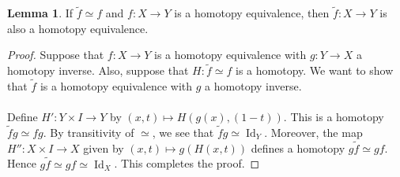 \documentclass[10pt,letterpaper,cm]{nupset}
\theoremstyle{definition}
\newtheorem{lemma}{Lemma}
\newcommand{\1}{\mathbf{1}}
\newcommand{\0}{\vec 0}
\DeclareMathOperator{\id}{Id}
\begin{document}
\begin{lemma}
If $\tilde{f} \simeq f$ and $f: X \to Y$ is a homotopy equivalence, then $\tilde{f} : X \to Y$ is also a homotopy equivalence.
\end{lemma}
\begin{proof}
Suppose that $f: X \to Y$ is a homotopy equivalence with $g: Y \to X$ a homotopy inverse. Also, suppose that $H: \tilde{f} \simeq f$ is a homotopy. We want to show that $\tilde{f}$ is a homotopy equivalence with $g$ a homotopy inverse. 
\\ \\ Define $H' : Y \times I \to Y$ by $(x,t) \mapsto H(g(x), (1-t))$. This is a homotopy $\tilde{f} g \simeq f g$. By transitivity of $\simeq$, we see that $\tilde{f} g  \simeq \id_Y$. Moreover, the map $H'' : X \times I \to X$ given by $(x,t) \mapsto g(H(x,t))$ defines a homotopy $g \tilde{f} \simeq gf$. Hence $g\tilde{f} \simeq gf \simeq \id_X$. This completes the proof.
\end{proof}
\end{document}
